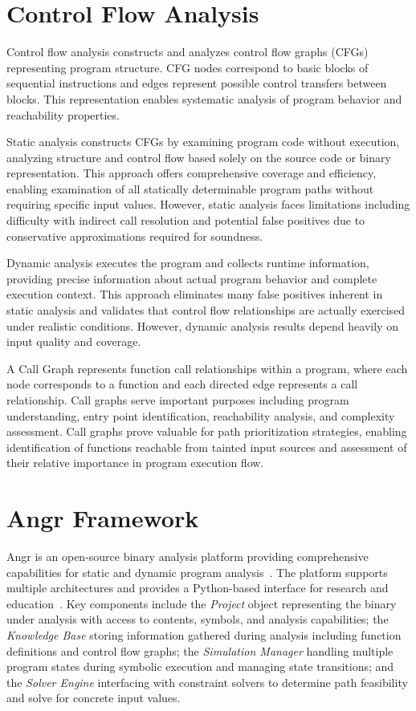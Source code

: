 \section{Control Flow Analysis}

Control flow analysis constructs and analyzes control flow graphs (CFGs) representing program structure. CFG nodes correspond to basic blocks of sequential instructions and edges represent possible control transfers between blocks. This representation enables systematic analysis of program behavior and reachability properties.

Static analysis constructs CFGs by examining program code without execution, analyzing structure and control flow based solely on the source code or binary representation. This approach offers comprehensive coverage and efficiency, enabling examination of all statically determinable program paths without requiring specific input values. However, static analysis faces limitations including difficulty with indirect call resolution and potential false positives due to conservative approximations required for soundness.

Dynamic analysis executes the program and collects runtime information, providing precise information about actual program behavior and complete execution context. This approach eliminates many false positives inherent in static analysis and validates that control flow relationships are actually exercised under realistic conditions. However, dynamic analysis results depend heavily on input quality and coverage.

A Call Graph represents function call relationships within a program, where each node corresponds to a function and each directed edge represents a call relationship. Call graphs serve important purposes including program understanding, entry point identification, reachability analysis, and complexity assessment. Call graphs prove valuable for path prioritization strategies, enabling identification of functions reachable from tainted input sources and assessment of their relative importance in program execution flow.

\section{Angr Framework}

Angr is an open-source binary analysis platform providing comprehensive capabilities for static and dynamic program analysis~\cite{shoshitaishvili_sok_2016}. The platform supports multiple architectures and provides a Python-based interface for research and education~\cite{springer_teaching_2018}. Key components include the \textit{Project} object representing the binary under analysis with access to contents, symbols, and analysis capabilities; the \textit{Knowledge Base} storing information gathered during analysis including function definitions and control flow graphs; the \textit{Simulation Manager} handling multiple program states during symbolic execution and managing state transitions; and the \textit{Solver Engine} interfacing with constraint solvers to determine path feasibility and solve for concrete input values.

